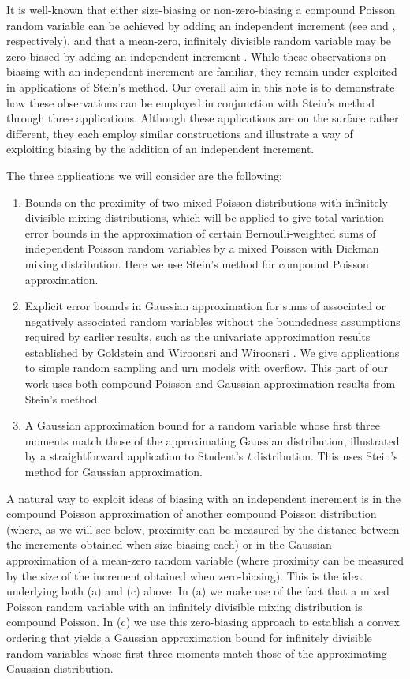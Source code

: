 \documentclass[12pt]{article}
\begin{document}
It is well-known that either size-biasing or non-zero-biasing a compound Poisson random variable can be achieved by adding an independent increment (see \cite{steutel73} and \cite{daly22}, respectively), and that a mean-zero, infinitely divisible random variable may be zero-biased by adding an independent increment \cite{goldstein24}. While these observations on biasing with an independent increment are familiar, they remain under-exploited in applications of Stein's method. Our overall aim in this note is to demonstrate how these observations can be employed in conjunction with Stein's method through three applications. Although these applications are on the surface rather different, they each employ similar constructions and illustrate a way of exploiting biasing by the addition of an independent increment.

The three applications we will consider are the following:
\begin{enumerate}
\item[(a)] Bounds on the proximity of two mixed Poisson distributions with infinitely divisible mixing distributions, which will be applied to give total variation error bounds in the approximation of certain Bernoulli-weighted sums of independent Poisson random variables by a mixed Poisson with Dickman mixing distribution. Here we use Stein's method for compound Poisson approximation.
\item[(b)] Explicit error bounds in Gaussian approximation for sums of associated or negatively associated random variables without the boundedness assumptions required by earlier results, such as the univariate approximation results established by Goldstein and Wiroonsri \cite{goldstein18} and Wiroonsri \cite{wiroonsri18}. We give applications to simple random sampling and urn models with overflow. This part of our work uses both compound Poisson and Gaussian approximation results from Stein's method.
\item[(c)] A Gaussian approximation bound for a random variable whose first three moments match those of the approximating Gaussian distribution, illustrated by a straightforward application to Student's \emph{t} distribution. This uses Stein's method for Gaussian approximation.
\end{enumerate}

A natural way to exploit ideas of biasing with an independent increment is in the compound Poisson approximation of another compound Poisson distribution (where, as we will see below, proximity can be measured by the distance between the increments obtained when size-biasing each) or in the Gaussian approximation of a mean-zero random variable (where proximity can be measured by the size of the increment obtained when zero-biasing). This is the idea underlying both (a) and (c) above. In (a) we make use of the fact that a mixed Poisson random variable with an infinitely divisible mixing distribution is compound Poisson. In (c) we use this zero-biasing approach to establish a convex ordering that yields a Gaussian approximation bound for infinitely divisible random variables whose first three moments match those of the approximating Gaussian distribution.
\end{document}
